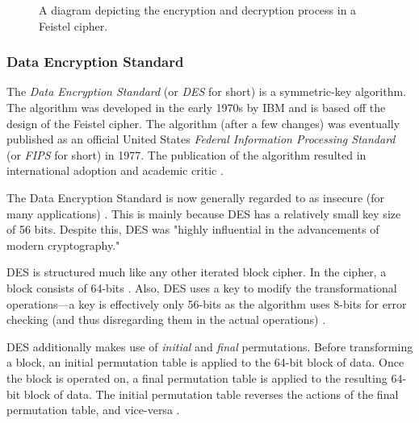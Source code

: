 \begin{figure}[H]
    \caption{A diagram depicting the encryption and decryption process in a Feistel cipher.}
\end{figure}

\subsubsection{Data Encryption Standard}

The \textit{Data Encryption Standard} (or \textit{DES} for short) is a symmetric-key algorithm. The algorithm was developed in the early 1970s by IBM and is based
off the design of the Feistel cipher. The algorithm (after a few changes) was eventually published as an official United States \textit{Federal Information Processing 
Standard} (or \textit{FIPS} for short) in 1977. The publication of the algorithm resulted in international adoption and academic critic \cite{wiki:des}. 

The Data Encryption Standard is now generally regarded to as insecure (for many applications) \cite{wiki:des}. This is mainly because DES has a relatively small key size of 
56 bits. Despite this, DES was "highly influential in the advancements of modern cryptography." \cite{wiki:des} 

DES is structured much like any other iterated block cipher. In the cipher, a block consists of 64-bits \cite{wiki:des}. Also, DES uses a key to modify the 
transformational operations---a key is effectively only 56-bits as the algorithm uses 8-bits for error checking (and thus disregarding them in the actual operations) 
\cite{wiki:des}.

DES additionally makes use of \textit{initial} and \textit{final} permutations. Before transforming a block, an initial permutation table is applied to the 64-bit block of data.
Once the block is operated on, a final permutation table is applied to the resulting 64-bit block of data. The initial permutation table reverses the actions of the
final permutation table, and vice-versa \cite{wiki:des}.

